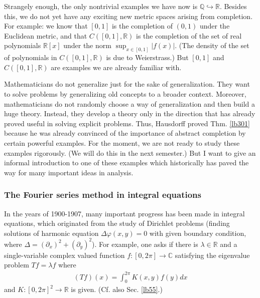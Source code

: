 \documentclass[12pt,b5paper,notitlepage]{article}
\theoremstyle{definition}
\theoremstyle{plain}
\newcommand{\Cbb}{\mathbb C}
\newcommand{\Qbb}{\mathbb Q}
\newcommand{\Rbb}{\mathbb R}
\numberwithin{equation}{section}
\begin{document}
Strangely enough, the only nontrivial examples we have now is $\Qbb\hookrightarrow\Rbb$. Besides this, we do not yet have  any exciting new metric spaces arising from completion. For example: we know that $[0,1]$ is the completion of $(0,1)$ under the Euclidean metric, and that $C([0,1],\Rbb)$ is the completion of the set of real polynomials $\Rbb[x]$ under the norm $\sup_{x\in[0,1]}|f(x)|$. (The density of the set of polynomials in $C([0,1],\Rbb)$ is due to Weierstrass.) But $[0,1]$ and $C([0,1],\Rbb)$ are examples we are already familiar with. 


Mathematicians do not generalize just for the sake of generalization. They want to solve problems by generalizing old concepts to a broader context. Moreover, mathematicians do not randomly choose a way of generalization and then build a huge theory. Instead, they develop a theory only in the direction that has already proved useful in solving explicit problems. Thus, Hausdorff proved Thm. \ref{lb301} because he was already convinced of the importance of abstract completion by certain powerful examples. For the moment, we are not ready to study these examples rigorously. (We will do this in the next semester.) But I want to give an informal introduction to one of these examples which historically has paved the way for many important ideas in analysis.


\subsubsection{The Fourier series method in integral equations}\label{lb370}




In the years of 1900-1907, many important progress has been made in integral equations, which originated from the study of Dirichlet problems (finding solutions of harmonic equation $\Delta \varphi(x,y)=0$ with given boundary condition, where $\Delta=(\partial_x)^2+(\partial_y)^2$). For example, one asks if there is $\lambda\in\Rbb$ and a  single-variable complex valued function $f:[0,2\pi]\rightarrow\Cbb$ satisfying the eigenvalue problem $Tf=\lambda f$ where
\begin{align*}
(Tf)(x)=\int_{0}^{2\pi}K(x,y)f(y)dx
\end{align*}
and $K:[0,2\pi]^2\rightarrow\Rbb$ is given. (Cf. also Sec. \ref{lb55}.)
\end{document}
